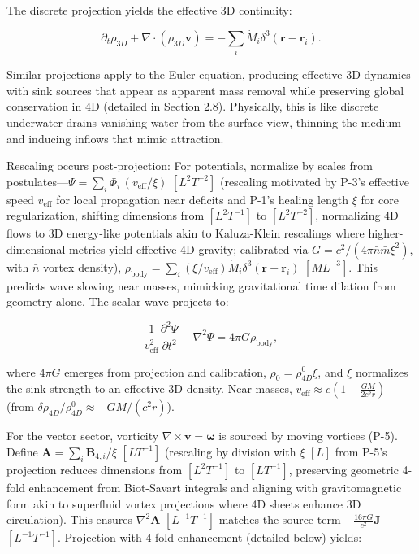 The discrete projection yields the effective 3D continuity:

\[
\partial_t \rho_{3D} + \nabla \cdot (\rho_{3D} \mathbf{v}) = -\sum_i \dot{M}_i \delta^3(\mathbf{r} - \mathbf{r}_i).
\]

Similar projections apply to the Euler equation, producing effective 3D dynamics with sink sources that appear as apparent mass removal while preserving global conservation in 4D (detailed in Section 2.8). Physically, this is like discrete underwater drains vanishing water from the surface view, thinning the medium and inducing inflows that mimic attraction.

Rescaling occurs post-projection: For potentials, normalize by scales from postulates---$\Psi = \sum_i \Phi_i \, (v_{\text{eff}} / \xi)$ $[L^2 T^{-2}]$ (rescaling motivated by P-3's effective speed $v_{\text{eff}}$ for local propagation near deficits and P-1's healing length $\xi$ for core regularization, shifting dimensions from $[L^2 T^{-1}]$ to $[L^2 T^{-2}]$, normalizing 4D flows to 3D energy-like potentials akin to Kaluza-Klein rescalings where higher-dimensional metrics yield effective 4D gravity; calibrated via $G = c^2 / (4\pi \bar{n} \bar{m} \xi^2)$, with $\bar{n}$ vortex density), $\rho_{\text{body}} = \sum_i \left( \xi / v_{\text{eff}} \right) \dot{M}_i \delta^3(\mathbf{r} - \mathbf{r}_i)$ $[M L^{-3}]$. This predicts wave slowing near masses, mimicking gravitational time dilation from geometry alone. The scalar wave projects to:

\begin{equation}
\frac{1}{v_{\text{eff}}^2} \frac{\partial^2 \Psi}{\partial t^2} - \nabla^2 \Psi = 4\pi G \rho_{\text{body}},
\end{equation}

where $4\pi G$ emerges from projection and calibration, $\rho_0 = \rho_{4D}^0 \xi$, and $\xi$ normalizes the sink strength to an effective 3D density. Near masses, $v_{\text{eff}} \approx c \left(1 - \frac{G M}{2 c^2 r}\right)$ (from $\delta \rho_{4D} / \rho_{4D}^0 \approx - G M / (c^2 r)$).

For the vector sector, vorticity $\nabla \times \mathbf{v} = \boldsymbol{\omega}$ is sourced by moving vortices (P-5). Define $\mathbf{A} = \sum_i \mathbf{B}_{4,i} / \xi$ $[L T^{-1}]$ (rescaling by division with $\xi$ $[L]$ from P-5's projection reduces dimensions from $[L^2 T^{-1}]$ to $[L T^{-1}]$, preserving geometric 4-fold enhancement from Biot-Savart integrals and aligning with gravitomagnetic form akin to superfluid vortex projections where 4D sheets enhance 3D circulation). This ensures $\nabla^2 \mathbf{A}$ $[L^{-1} T^{-1}]$ matches the source term $-\frac{16\pi G}{c^2} \mathbf{J}$ $[L^{-1} T^{-1}]$. Projection with 4-fold enhancement (detailed below) yields:

